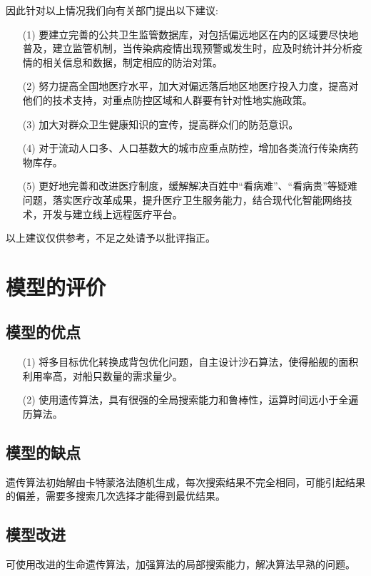 \documentclass{whutmod}
\begin{document}
    因此针对以上情况我们向有关部门提出以下建议:
    \begin{itemize}                                             
    	\item [(1)] 要建立完善的公共卫生监管数据库，对包括偏远地区在内的区域要尽快地普及，建立监管机制，当传染病疫情出现预警或发生时，应及时统计并分析疫情的相关信息和数据，制定相应的防治对策。
    	\item [(2)]努力提高全国地医疗水平，加大对偏远落后地区地医疗投入力度，提高对他们的技术支持，对重点防控区域和人群要有针对性地实施政策。
    	\item [(3)]加大对群众卫生健康知识的宣传，提高群众们的防范意识。
    	\item [(4)]对于流动人口多、人口基数大的城市应重点防控，增加各类流行传染病药物库存。
    	\item [(5)]更好地完善和改进医疗制度，缓解解决百姓中“看病难”、“看病贵”等疑难问题，落实医疗改革成果，提升医疗卫生服务能力，结合现代化智能网络技术，开发与建立线上远程医疗平台。	
    \end{itemize}
	以上建议仅供参考，不足之处请予以批评指正。


	\section{模型的评价}
	
	\subsection{模型的优点}
		\begin{itemize}                                             

		\item [(1)] 将多目标优化转换成背包优化问题，自主设计沙石算法，使得船舰的面积利用率高，对船只数量的需求量少。
		\item [(2)] 使用遗传算法，具有很强的全局搜索能力和鲁棒性，运算时间远小于全遍历算法。
	\end{itemize}
	\subsection{模型的缺点}
	
	遗传算法初始解由卡特蒙洛法随机生成，每次搜索结果不完全相同，可能引起结果的偏差，需要多搜索几次选择才能得到最优结果。
	\subsection{模型改进}
	可使用改进的生命遗传算法，加强算法的局部搜索能力，解决算法早熟的问题。
\end{document}

